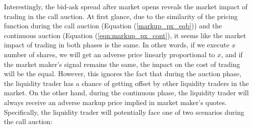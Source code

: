 \documentclass{article}
\begin{document}
Interestingly, the bid-ask spread after market opens reveals the market impact of trading in the call auction. At first glance, due to the similarity of the pricing function during the call auction (Equation (\ref{markup_px_eqb})) and the continuous auction (Equation (\ref{eqn:markup_px_cont}), it seems like the market impact of trading in both phases is the same. In other words, if we execute $x$ number of shares, we will get an adverse price linearly proportional to $x$, and if the market maker's signal remains the same, the impact on the cost of trading will be the equal. However, this ignores the fact that during the auction phase, the liquidity trader has a chance of getting offset by other liquidity traders in the market. On the other hand, during the continuous phase, the liquidity trader will always receive an adverse markup price implied in market maker's quotes. Specifically, the liquidity trader will potentially face one of two scenarios during the call auction:
\end{document}
